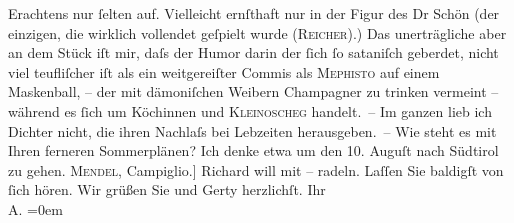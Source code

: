\begin{ledgroupsized}[t]{13cm}
                    Erachtens nur ſelten auf. Vielleicht ernſthaft nur in der Figur des Dr Schön (der einzigen, die
                    wirklich vollendet geſpielt wurde \introOben{}(\textsc{Reicher})\introOben{}.) Das unerträgliche aber an dem Stück iſt mir, daſs der Humor
                    darin der ſich ſo sataniſch geberdet, nicht viel teufliſcher iſt als ein
                    weitgereiſter Commis \introOben{}als \textsc{Mephisto}\introOben{} auf einem Maskenball, – der mit dämoniſchen Weibern Champagner zu trinken
                    vermeint – während es {\pb}ſich um Köchinnen und \textsc{Kleinoscheg} handelt. – Im ganzen lieb ich Dichter
                    nicht, die ihren Nachlaſs bei Lebzeiten herausgeben. –\pend
           \pstart
           Wie steht es mit Ihren ferneren Sommerplänen? Ich denke etwa um den 10.
                        Auguſt nach Südtirol zu gehen. \textsc{Mendel}, Campiglio\oindex{Madonna di Campiglio@\textbf{Madonna di Campiglio}|pw}{[}.{]}{ }Richard will mit – radeln.\pend
           \pstart
           Laſſen Sie baldigſt von ſich hören. Wir grüßen Sie und Gerty herzlichſt.\pend
           \pstart
           Ihr{\\[\baselineskip]}\spacefill\mbox{A.}\pend
           \leftskip=0em{}
         
         \endnumbering{}\end{ledgroupsized}  \newcommand{\dateiname}{L01300}\newcommand{\titel}{Arthur Schnitzler an Hugo von Hofmannsthal, 26. 6. 1903}\newcommand{\editorInnen}{ Martin Anton Müller und Gerd-Hermann Susen}
      